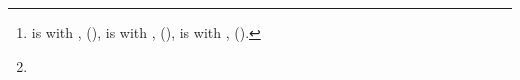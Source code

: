 \documentclass[letterpaper, 10pt, conference,draft]{ieeeconf}
\begin{document}
\title{}

\author{
    \authorblockN{}
    \and
    \authorblockN{}
    \and
    \authorblockN{}
    \thanks{
        \protect is with
        \protect,
        \protect
        (\protect),
        \protect is with 
        \protect,
        \protect 
        (\protect),
        \protect is with 
        \protect,
        \protect 
        (\protect).
    }
    \thanks{
        \protect
    }
}
\maketitle


\end{document}
